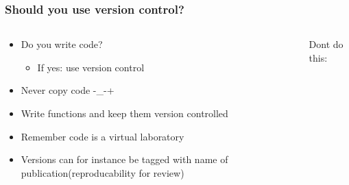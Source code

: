 \begin{frame}[fragile]

	\frametitle{Should you use version control?}
	\begin{columns}
		\begin{column}{0.5\textwidth}
			\begin{itemize}[<+->]
				\item Do you write code?
					\begin{itemize}[<+->]
						\item If yes: use version control
					\end{itemize}
				\item Never copy code -\_-+
				\item Write functions and keep them version controlled
				\item Remember code is a virtual laboratory
				\item Versions can for instance be tagged with name of publication(reproducability for review)
			\end{itemize}
		\end{column}
		\begin{column}{0.5\textwidth}
			Dont do this:
			
		\end{column}
	\end{columns}

\end{frame}
